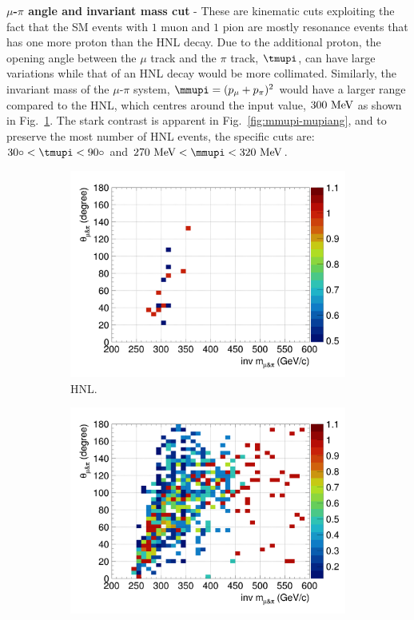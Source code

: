         \textbf{$\mu$-$\pi$ angle and invariant mass cut} - These are kinematic cuts exploiting the fact that the SM events with $1$ muon and $1$ pion are mostly resonance events that has one more proton than the HNL decay. 
        Due to the additional proton, the opening angle between the $\mu$ track and the $\pi$ track, $\tmupi$, can have large variations while that of an HNL decay would be more collimated. 
        Similarly, the invariant mass of the $\mu$-$\pi$ system, $\mmupi=(\pmu+\ppi)^2$ would have a larger range compared to the HNL, which centres around the input value, $300~\textrm{MeV}$ as shown in Fig.~\ref{fig:hnl-mmupi}.
        The stark contrast is apparent in Fig.~\ref{fig:mmupi-mupiang}, and to preserve the most number of HNL events, the specific cuts are: $30\degree<\tmupi<90\degree$ and $270~\mev<\mmupi<320~\mev$. 
        \begin{figure}[!htb]
           \centering
           \begin{subfigure}{0.45\textwidth}
                \includegraphics[width=\textwidth]{figures/hnl_sfgmu_mpinvm_colnor_vs_mpang_hist2d_al9_300.png}
                \caption{HNL.}
                \label{fig:hnl-mmupi}
           \end{subfigure}
           \begin{subfigure}{0.45\textwidth}
                \includegraphics[width=\textwidth]{figures/hnl_sfgmu_mpinvm_colnor_vs_mpang_hist2d_al9_SM.png}

\end{subfigure}
\end{figure}
